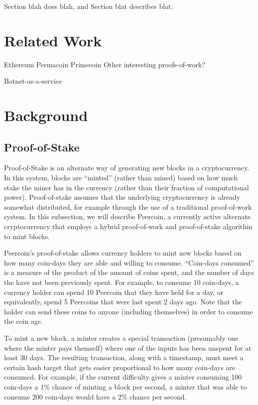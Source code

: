 Section blah does blah, and Section blat describes blat.





\section{Related Work}

Ethereum
Permacoin
Primecoin
Other interesting proofs-of-work?

Botnet-as-a-service

\section{Background}

\subsection{Proof-of-Stake}

Proof-of-Stake is an alternate way of generating new blocks in a cryptocurrency.
In this system, blocks are ``minted'' (rather than mined) based on how much
stake the miner has in the currency (rather than their fraction of computational
power). Proof-of-stake assumes that the underlying cryptocurrency is already
somewhat distributed, for example through the use of a traditional proof-of-work
system. In this subsection, we will describe Peercoin, a currently active
alternate cryptocurrency that employs a hybrid proof-of-work and proof-of-stake
algorithm to mint blocks.

Peercoin's proof-of-stake allows currency holders to mint new blocks based on
how many coin-days they are able and willing to consume. ``Coin-days
consumed'' is a measure of the product of the amount of coins spent, and the
number of days the have not been previously spent. For example, to consume 10
coin-days, a currency holder can spend 10 Peercoin that they have held for a
day, or equivalently, spend 5 Peercoins that were last spent 2 days ago. Note
that the holder can send these coins to anyone (including themselves) in order
to consume the coin age.

To mint a new block, a minter creates a special transaction (presumably one
where the minter pays themself) where one of the
inputs has been unspent for at least 30 days. The resulting transaction, along
with a timestamp, must meet a certain hash target that gets easier proportional to how many
coin-days are consumed. For example, if the current difficulty gives a minter
consuming 100 coin-days a 1\% chance of minting a block per second, a minter
that was able to consume 200 coin-days would have a 2\% chance per second.

